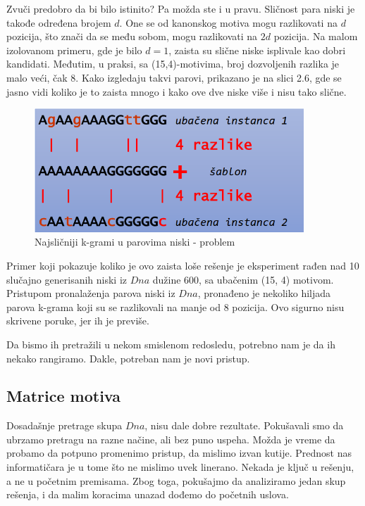 Zvuči predobro da bi bilo istinito? Pa možda ste i u pravu. 
Sličnost para niski je takođe određena brojem $d$. One se od kanonskog motiva mogu razlikovati na $d$ pozicija, što znači da se među sobom, mogu razlikovati na $2d$ pozicija.
Na malom izolovanom primeru, gde je bilo $d = 1$, zaista su slične niske isplivale kao dobri kandidati. Međutim, u praksi, sa (15,4)-motivima, broj dozvoljenih razlika je malo veći, čak 8. Kako izgledaju takvi parovi, prikazano je na slici 2.6, gde se jasno vidi koliko je to zaista mnogo i kako ove dve niske više i nisu tako slične.
\begin{figure}[h]
\caption{Najsličniji k-grami u parovima niski - problem}
\centering
\includegraphics[width=0.9\textwidth]{poglavlja/2/slike/26.PNG}
\end{figure}

\newpage

Primer koji pokazuje koliko je ovo zaista loše rešenje je eksperiment rađen nad 10 slučajno generisanih niski iz $Dna$ dužine 600, sa ubačenim (15, 4) motivom. Pristupom pronalaženja parova niski iz $Dna$, pronađeno je nekoliko hiljada parova k-grama koji su se razlikovali na manje od 8 pozicija. Ovo sigurno nisu skrivene poruke, jer ih je previše. 

Da bismo ih pretražili u nekom smislenom redosledu, potrebno nam je da ih nekako rangiramo. Dakle, potreban nam je novi pristup.


\subsection{Matrice motiva}


Dosadašnje pretrage skupa $Dna$, nisu dale dobre rezultate. Pokušavali smo da ubrzamo pretragu na razne načine, ali bez puno uspeha. Možda je vreme da probamo da potpuno promenimo pristup, da mislimo izvan kutije. Prednost nas informatičara je u tome što ne mislimo uvek linerano. Nekada je ključ u rešenju, a ne u početnim premisama. Zbog toga, pokušajmo da analiziramo jedan skup rešenja, i da malim koracima unazad dođemo do početnih uslova.

